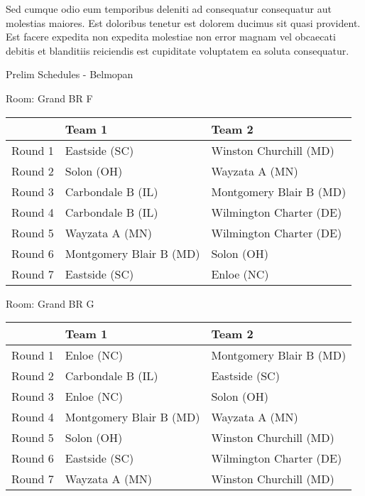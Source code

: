 \documentclass{article}%
\begin{document}
\newline%
Sed cumque odio eum temporibus deleniti ad consequatur consequatur aut molestias maiores. Est doloribus tenetur est dolorem ducimus sit quasi provident. Est facere expedita non expedita molestiae non error magnam vel obcaecati debitis et blanditiis reiciendis est cupiditate voluptatem ea soluta consequatur.%
\newpage%
\begin{center}%
\begin{Huge}%
Prelim Schedules {-} Belmopan%
\end{Huge}%
\end{center}%
\begin{flushleft}%
\begin{Large}%
Room: Grand BR F%
\end{Large}%
\end{flushleft}%
\begin{tabularx}{\textwidth}{|c|Y|Y|}%
\hline%
&Team 1&Team 2\\%
\hline%
Round 1&Eastside (SC)&Winston Churchill (MD)\\%
Round 2&Solon (OH)&Wayzata A (MN)\\%
Round 3&Carbondale B (IL)&Montgomery Blair B (MD)\\%
Round 4&Carbondale B (IL)&Wilmington Charter (DE)\\%
Round 5&Wayzata A (MN)&Wilmington Charter (DE)\\%
Round 6&Montgomery Blair B (MD)&Solon (OH)\\%
Round 7&Eastside (SC)&Enloe (NC)\\%
\hline%
\end{tabularx}%
\vspace*{8pt}%
\linebreak%
\begin{flushleft}%
\begin{Large}%
Room: Grand BR G%
\end{Large}%
\end{flushleft}%
\begin{tabularx}{\textwidth}{|c|Y|Y|}%
\hline%
&Team 1&Team 2\\%
\hline%
Round 1&Enloe (NC)&Montgomery Blair B (MD)\\%
Round 2&Carbondale B (IL)&Eastside (SC)\\%
Round 3&Enloe (NC)&Solon (OH)\\%
Round 4&Montgomery Blair B (MD)&Wayzata A (MN)\\%
Round 5&Solon (OH)&Winston Churchill (MD)\\%
Round 6&Eastside (SC)&Wilmington Charter (DE)\\%
Round 7&Wayzata A (MN)&Winston Churchill (MD)\\%
\hline%
\end{tabularx}%
\end{document}
